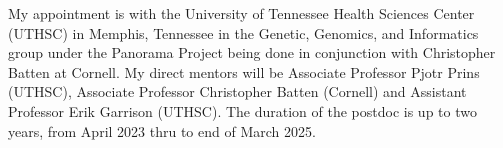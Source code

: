 My appointment is with the University of Tennessee Health Sciences Center (UTHSC) in Memphis, Tennessee in the Genetic, Genomics, and Informatics group under the Panorama Project being done in conjunction with Christopher Batten at Cornell.
My direct mentors will be Associate Professor Pjotr Prins (UTHSC), Associate Professor Christopher Batten (Cornell) and Assistant Professor Erik Garrison (UTHSC).
The duration of the postdoc is up to two years, from April 2023 thru to end of March 2025.
